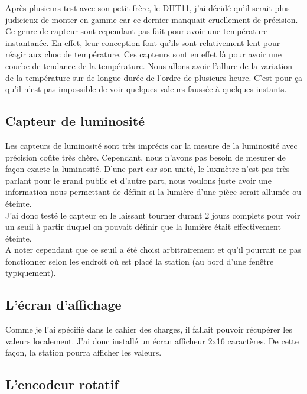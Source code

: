 Après plusieurs test avec son petit frère, le DHT11, j'ai décidé qu'il serait plus judicieux de monter en gamme car ce dernier manquait cruellement de précision. Ce genre de capteur sont cependant pas fait pour avoir une température instantanée. En effet, leur conception font qu'ils sont relativement lent pour réagir aux choc de température. Ces capteurs sont en effet là pour avoir une courbe de tendance de la température. Nous allons avoir l'allure de la variation de la température sur de longue durée de l'ordre de plusieurs heure. C'est pour ça qu'il n'est pas impossible de voir quelques valeurs faussée à quelques instants.\\

\subsection{Capteur de luminosité}

Les capteurs de luminosité sont très imprécis car la mesure de la luminosité avec précision coûte très chère. Cependant, nous n'avons pas besoin de mesurer de façon exacte la luminosité. D'une part car son unité, le luxmètre n'est pas très parlant pour le grand public et d'autre part, nous voulons juste avoir une information nous permettant de définir si la lumière d'une pièce serait allumée ou éteinte.\\

J'ai donc testé le capteur en le laissant tourner durant 2 jours complets pour voir un seuil à partir duquel on pouvait définir que la lumière était effectivement éteinte.\\

A noter cependant que ce seuil a été choisi arbitrairement et qu'il pourrait ne pas fonctionner selon les endroit où est placé la station (au bord d'une fenêtre typiquement).\\


\subsection{L'écran d'affichage}

Comme je l'ai spécifié dans le cahier des charges, il fallait pouvoir récupérer les valeurs localement. J'ai donc installé un écran afficheur 2x16 caractères.
De cette façon, la station pourra afficher les valeurs.\\

\subsection{L'encodeur rotatif}

